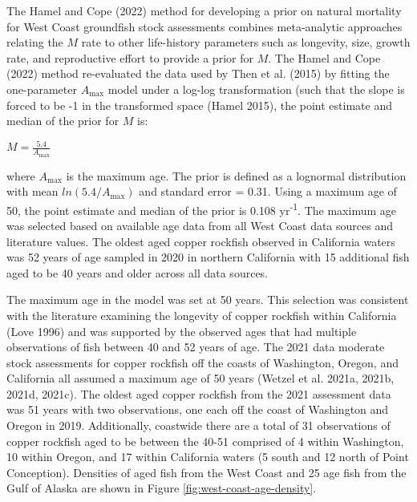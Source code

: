 \documentclass[11pt,
  english,
  letterpaper,
]{article}
\begin{document}
The Hamel and Cope (2022) method for developing a prior on natural mortality for West Coast groundfish stock assessments combines meta-analytic approaches relating the \(M\) rate to other life-history parameters such as longevity, size, growth rate, and reproductive effort to provide a prior for \(M\). The Hamel and Cope (2022) method re-evaluated the data used by Then et al. (2015) by fitting the one-parameter \(A_{\text{max}}\) model under a log-log transformation (such that the slope is forced to be -1 in the transformed space (Hamel 2015), the point estimate and median of the prior for \(M\) is:

\begin{centering}

$M=\frac{5.4}{A_{\text{max}}}$

\end{centering}

\vspace{0.5cm}

where \(A_{\text{max}}\) is the maximum age. The prior is defined as a lognormal distribution with mean \(ln(5.4/A_{\text{max}})\) and standard error = 0.31. Using a maximum age of 50, the point estimate and median of the prior is 0.108 yr\textsuperscript{-1}. The maximum age was selected based on available age data from all West Coast data sources and literature values. The oldest aged copper rockfish observed in California waters was 52 years of age sampled in 2020 in northern California with 15 additional fish aged to be 40 years and older across all data sources.

The maximum age in the model was set at 50 years. This selection was consistent with the literature examining the longevity of copper rockfish within California (Love 1996) and was supported by the observed ages that had multiple observations of fish between 40 and 52 years of age. The 2021 data moderate stock assessments for copper rockfish off the coasts of Washington, Oregon, and California all assumed a maximum age of 50 years (Wetzel et al. 2021a, 2021b, 2021d, 2021c). The oldest aged copper rockfish from the 2021 assessment data was 51 years with two observations, one each off the coast of Washington and Oregon in 2019. Additionally, coastwide there are a total of 31 observations of copper rockfish aged to be between the 40-51 comprised of 4 within Washington, 10 within Oregon, and 17 within California waters (5 south and 12 north of Point Conception). Densities of aged fish from the West Coast and 25 age fish from the Gulf of Alaska are shown in Figure \ref{fig:west-coast-age-density}.
\end{document}
